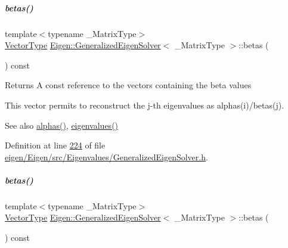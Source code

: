 \mbox{\label{group___eigenvalues___module_abeaa6f56cee367b83fd09d428462ca0c}} 
\subparagraph{\texorpdfstring{betas()}{betas()}\hspace{0.1cm}{\footnotesize\ttfamily [1/2]}}
{\footnotesize\ttfamily template$<$typename \+\_\+\+Matrix\+Type$>$ \\
\hyperlink{group___eigenvalues___module_a5aa3d1390c2b0d455c1c9b8b3101b119}{Vector\+Type} \hyperlink{group___eigenvalues___module_class_eigen_1_1_generalized_eigen_solver}{Eigen\+::\+Generalized\+Eigen\+Solver}$<$ \+\_\+\+Matrix\+Type $>$\+::betas (\begin{DoxyParamCaption}{ }\end{DoxyParamCaption}) const\hspace{0.3cm}{\ttfamily [inline]}}

\begin{DoxyReturn}{Returns}
A const reference to the vectors containing the beta values
\end{DoxyReturn}
This vector permits to reconstruct the j-\/th eigenvalues as alphas(i)/betas(j).

\begin{DoxySeeAlso}{See also}
\hyperlink{group___eigenvalues___module_a82b1bc41267f46e5c5899d5b084a73bb}{alphas()}, \hyperlink{group___eigenvalues___module_a62f01cd78271efd5e39bcb24e0fe1a58}{eigenvalues()} 
\end{DoxySeeAlso}


Definition at line \hyperlink{eigen_2_eigen_2src_2_eigenvalues_2_generalized_eigen_solver_8h_source_l00224}{224} of file \hyperlink{eigen_2_eigen_2src_2_eigenvalues_2_generalized_eigen_solver_8h_source}{eigen/\+Eigen/src/\+Eigenvalues/\+Generalized\+Eigen\+Solver.\+h}.

\mbox{\label{group___eigenvalues___module_abeaa6f56cee367b83fd09d428462ca0c}} 
\subparagraph{\texorpdfstring{betas()}{betas()}\hspace{0.1cm}{\footnotesize\ttfamily [2/2]}}
{\footnotesize\ttfamily template$<$typename \+\_\+\+Matrix\+Type$>$ \\
\hyperlink{group___eigenvalues___module_a5aa3d1390c2b0d455c1c9b8b3101b119}{Vector\+Type} \hyperlink{group___eigenvalues___module_class_eigen_1_1_generalized_eigen_solver}{Eigen\+::\+Generalized\+Eigen\+Solver}$<$ \+\_\+\+Matrix\+Type $>$\+::betas (\begin{DoxyParamCaption}{ }\end{DoxyParamCaption}) const\hspace{0.3cm}{\ttfamily [inline]}}

